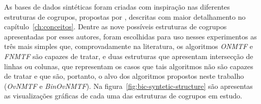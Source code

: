 \documentclass[
    12pt,                %
    oneside,            %
    a4paper,            %
    english,            %
    brazil                %
    ]{abntex2ppgsi}
\begin{document}


As bases de dados sintéticas foram criadas com inspiração nas diferentes estruturas de cogrupos, propostas por , descritas com maior detalhamento no capítulo~\ref{ch:conceitos}. Dentre as nove possíveis estruturas de cogrupos apresentadas por esses autores, foram escolhidas para uso nesses experimentos as três mais simples que, comprovadamente na literatura, os algoritmos \textit{ONMTF} e \textit{FNMTF} são capazes de tratar, e duas estruturas que apresentam intersecção de linhas ou colunas, que representam os casos que tais algoritmos não são capazes de tratar e que são, portanto, o alvo dos algoritmos propostos neste trabalho (\textit{OvNMTF} e \textit{BinOvNMTF}). Na figura~\ref{fig:bic-syntetic-structure} são apresentas as visualizações gráficas de cada uma das estruturas de cogrupos em estudo.
\end{document}
